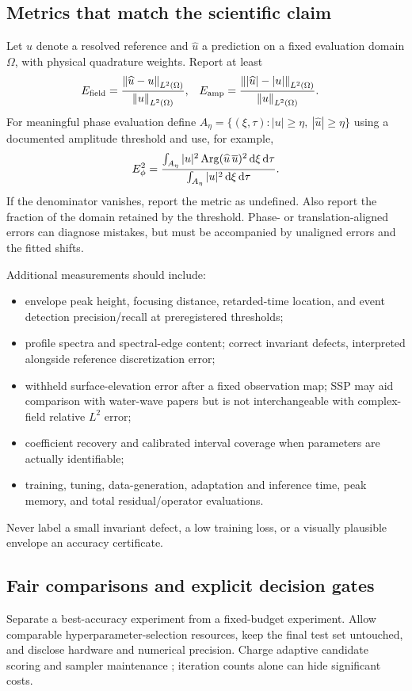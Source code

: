 \subsection{Metrics that match the scientific claim}
Let $u$ denote a resolved reference and $\widehat u$ a prediction on a
fixed evaluation domain $\Omega$, with physical quadrature weights.
Report at least
\begin{align}
 E_{\rm field}&=\frac{\left\lVert\widehat u-u\right\rVert_{L^2(\Omega)}}
                         {\left\lVert u\right\rVert_{L^2(\Omega)}},&
 E_{\rm amp}&=\frac{\left\lVert|\widehat u|-|u|\right\rVert_{L^2(\Omega)}}
                         {\left\lVert u\right\rVert_{L^2(\Omega)}}. \label{eq:metrics}
\end{align}
For meaningful phase evaluation define
$A_\eta=\{(\xi,\tau):|u|\geq\eta,\ |\widehat u|\geq\eta\}$
using a documented amplitude threshold and use, for example,
\[
 E_\phi^2=
 \frac{\int_{A_\eta}|u|^2
     \operatorname{Arg}(\widehat u\,\overline u)^2\,\mathrm{d}\xi\,\mathrm{d}\tau}
      {\int_{A_\eta}|u|^2\,\mathrm{d}\xi\,\mathrm{d}\tau}.
\]
If the denominator vanishes, report the metric as undefined. Also report
the fraction of the domain retained by the threshold. Phase- or
translation-aligned errors can diagnose mistakes, but must be accompanied
by unaligned errors and the fitted shifts.

Additional measurements should include:
\begin{itemize}
\item envelope peak height, focusing distance, retarded-time location,
and event detection precision/recall at preregistered thresholds;
\item profile spectra and spectral-edge content; correct invariant
defects, interpreted alongside reference discretization error;
\item withheld surface-elevation error after a fixed observation map;
SSP may aid comparison with water-wave papers but is not interchangeable
with complex-field relative $L^2$ error;
\item coefficient recovery and calibrated interval coverage when
parameters are actually identifiable;
\item training, tuning, data-generation, adaptation and inference time,
peak memory, and total residual/operator evaluations.
\end{itemize}
Never label a small invariant defect, a low training loss, or a visually
plausible envelope an accuracy certificate.

\subsection{Fair comparisons and explicit decision gates}
Separate a best-accuracy experiment from a fixed-budget experiment.
Allow comparable hyperparameter-selection resources, keep the final
test set untouched, and disclose hardware and numerical precision.
Charge adaptive candidate scoring and sampler maintenance
\cite{operatorbudget}; iteration counts alone can hide significant costs.


